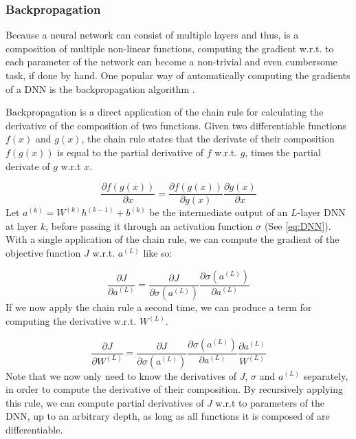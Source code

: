 \subsubsection{Backpropagation}
\label{sec:backprop}
Because a neural network can consist of multiple layers and thus, is a composition of multiple non-linear functions, computing the gradient w.r.t. to each parameter of the network can become a non-trivial and even cumbersome task, if done by hand. One popular way of automatically computing the gradients of a DNN is the backpropagation algorithm \cite{rumelhart1988learning}.

Backpropagation is a direct application of the chain rule for calculating the derivative of the composition of two functions. Given two differentiable functions $f(x)$ and $g(x)$, the chain rule states that the derivate of their composition $f(g(x))$ is equal to the partial derivative of $f$ w.r.t. $g$, times the partial derivate of $g$ w.r.t $x$.

\begin{equation}
    \frac{\partial f(g(x))}{\partial x} = \frac{\partial f(g(x))}{\partial g(x)} \frac{\partial g(x)}{\partial x}
\end{equation}
Let $a^{(k)} = W^{(k)} h^{(k-1)} + b^{(k)}$ be the intermediate output of an $L$-layer DNN at layer $k$, before passing it through an activation function $\sigma$ (See \ref{eq:DNN}). With a single application of the chain rule, we can compute the gradient of the objective function $J$ w.r.t. $a^{(L)}$ like so:

\begin{equation}
    \frac{\partial J}{\partial a^{(L)}} = \frac{\partial J}{\partial \sigma(a^{(L)})} \frac{\partial \sigma(a^{(L)})}{\partial a^{(L)}}
\end{equation}
If we now apply the chain rule a second time, we can produce a term for computing the derivative w.r.t. $W^{(L)}$.

\begin{equation}
    \frac{\partial J}{\partial W^{(L)}} = \frac{\partial J}{\partial \sigma(a^{(L)})} \frac{\partial \sigma(a^{(L)})}{\partial a^{(L)}} \frac{\partial a^{(L)}}{W^{(L)}}
\end{equation}
Note that we now only need to know the derivatives of $J$, $\sigma$ and $a^{(L)}$ separately, in order to compute the derivative of their composition. By recursively applying this rule, we can compute partial derivatives of $J$ w.r.t to parameters of the DNN, up to an arbitrary depth, as long as all functions it is composed of are differentiable.

